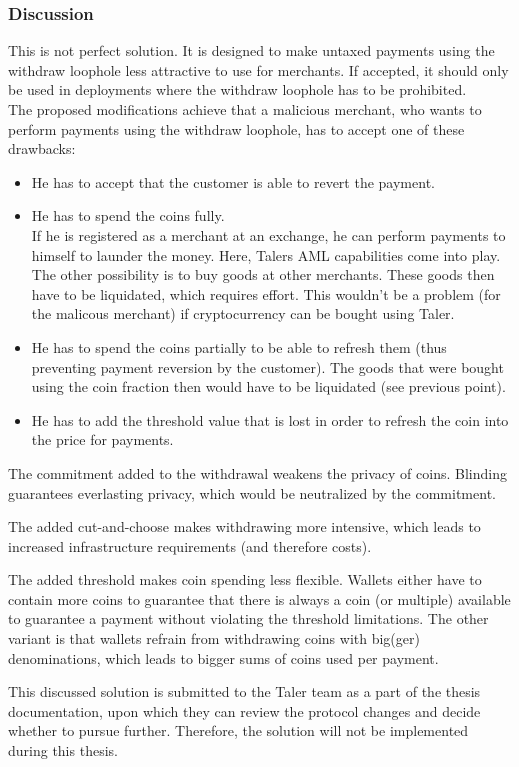 \subsubsection{Discussion}
This is not perfect solution.
It is designed to make untaxed payments using the withdraw loophole less attractive to use for merchants.
If accepted, it should only be used in deployments where the withdraw loophole has to be prohibited.\\
The proposed modifications achieve that a malicious merchant, who wants to perform payments using the withdraw loophole, has to accept one of these drawbacks:
\begin{itemize}
    \item He has to accept that the customer is able to revert the payment.
    \item He has to spend the coins fully.\\
    If he is registered as a merchant at an exchange, he can perform payments to himself to launder the money.
    Here, Talers \ac{AML} capabilities come into play.\\
    The other possibility is to buy goods at other merchants.
    These goods then have to be liquidated, which requires effort.
    This wouldn't be a problem (for the malicous merchant) if cryptocurrency can be bought using Taler.
    \item He has to spend the coins partially to be able to refresh them (thus preventing payment reversion by the customer).
    The goods that were bought using the coin fraction then would have to be liquidated (see previous point).
    \item He has to add the threshold value that is lost in order to refresh the coin into the price for payments.
\end{itemize}

The commitment added to the withdrawal weakens the privacy of coins.
Blinding guarantees everlasting privacy, which would be neutralized by the commitment.

The added cut-and-choose makes withdrawing more intensive, which leads to increased infrastructure requirements (and therefore costs).

The added threshold makes coin spending less flexible.
Wallets either have to contain more coins to guarantee that there is always a coin (or multiple) available to guarantee a payment without violating the threshold limitations.
The other variant is that wallets refrain from withdrawing coins with big(ger) denominations, which leads to bigger sums of coins used per payment.

This discussed solution is submitted to the Taler team as a part of the thesis documentation, upon which they can review the protocol changes and decide whether to pursue further.
Therefore, the solution will not be implemented during this thesis.
